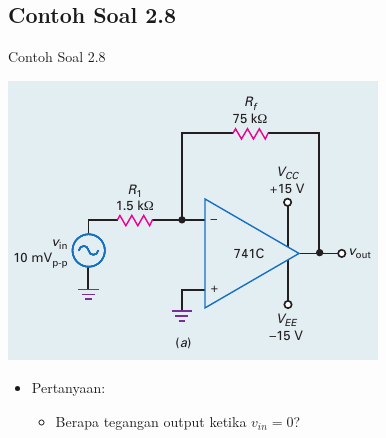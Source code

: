 \subsection{Contoh Soal 2.8}
\begin{frame}[t]{Contoh Soal 2.8}
	\begin{multicols}{2}
		\begin{center}
			\includegraphics[width=\linewidth]{gambar/fig-16.17a}
		\end{center}
		\columnbreak
		\begin{itemize}
			\item Pertanyaan:
			\begin{itemize}
				\item Berapa tegangan output ketika $ v_{in} = 0 $?
			\end{itemize}
		\end{itemize}
	\end{multicols}
\end{frame}

